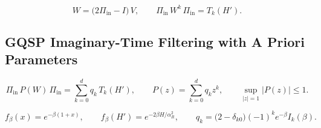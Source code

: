 \begin{equation}
    W = \bigl(2\Pi_{\mathrm{in}} - I\bigr)\,V,
    \qquad
    \Pi_{\mathrm{in}}\,W^{k}\,\Pi_{\mathrm{in}} = T_k(H') .
    \label{eq:walk}
\end{equation}

\subsection{GQSP Imaginary-Time Filtering with A Priori Parameters}
\label{sec:pipeline-qite}

\begin{equation}
    \Pi_{\mathrm{in}}\,P(W)\,\Pi_{\mathrm{in}} = \sum_{k=0}^{d} q_k\,T_k(H'),
    \qquad
    P(z) = \sum_{k=0}^{d} q_k z^k,
    \qquad
    \sup_{|z|=1} |P(z)| \le 1 .
    \label{eq:gqsp-block}
\end{equation}

\begin{equation}
    f_\beta(x) = e^{-\beta(1+x)},
    \qquad
    f_\beta(H') = e^{-2\beta H/\alpha_R^2},
    \qquad
    q_k = \bigl(2 - \delta_{k0}\bigr)(-1)^k e^{-\beta} I_k(\beta) .
    \label{eq:qite-filter}
\end{equation}


